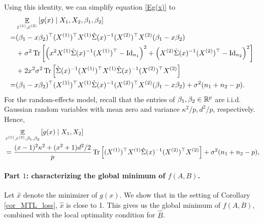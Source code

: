 Using this identity, we can simplify equation \eqref{Eg(x)}  to
\begin{align*}
		&\mathop{\mathbb{E}}_{\varepsilon^{(1)}, \varepsilon^{(2)}}\left[ g(x) \mid X_1, X_2 ,\beta_1,\beta_2 \right] \\
		=& (\beta_1-x\beta_2)^\top(X^{(1)} )^\top X^{(1)}  \hat\Sigma(x)^{-1} (X^{(2)})^\top X^{(2)} (\beta_1-x\beta_2)  \\
		&+ \sigma^2\operatorname{Tr}\left[ \left(x^2 X^{(1)}\hat\Sigma(x)^{-1} (X^{(1)})^\top-\operatorname{Id}_{n_1}\right)^2+ \left(X^{(2)}\hat\Sigma(x)^{-1} (X^{(2)})^\top-\operatorname{Id}_{n_2}\right)^2 \right]\\
&+ 2 x^2 \sigma^2 \operatorname{Tr}\left[ \hat\Sigma(x)^{-1}  (X^{(1)})^\top X^{(1)}\hat\Sigma(x)^{-1} (X^{(2)})^\top X^{(2)} \right]  \nonumber\\
		=& (\beta_1-x\beta_2)^\top(X^{(1)} )^\top X^{(1)}  \hat\Sigma(x)^{-1} (X^{(2)})^\top X^{(2)} (\beta_1-x\beta_2) +\sigma^2(n_1+n_2-p).
\end{align*}
For the random-effects model, recall that the entries of $\beta_1, \beta_2\in \mathbb{R}^p$ are i.i.d. Gaussian random variables with mean zero and variance $\kappa^2/p, d^2/p$, respectively.
Hence,
\begin{align}
&\mathop{\mathbb{E}}_{\varepsilon^{(1)}, \varepsilon^{(2)} ,\beta_1,\beta_2}\left[ g(x) \mid X_1, X_2 \right] \nonumber\\
&=\frac{(x-1)^2\kappa^2 + (x^2+1)d^2/2}{p} \operatorname{Tr}\left[ (X^{(1)})^\top X^{(1)} \hat \Sigma(x)^{-1}(X^{(2)})^\top X^{(2)}\right]+\sigma^2(n_1+n_2-p), \label{EgA}
\end{align}


\paragraph{Part $1$: characterizing the global minimum of $f(A, B)$.}
Let $\hat{x}$ denote the minimizer of $g(x)$.
We show that in the setting of Corollary \ref{cor_MTL_loss}, $\hat x$ is close to 1.
This gives us the global minimum of $f(A, B)$, combined with the local optimality condition for $\hat{B}$.

